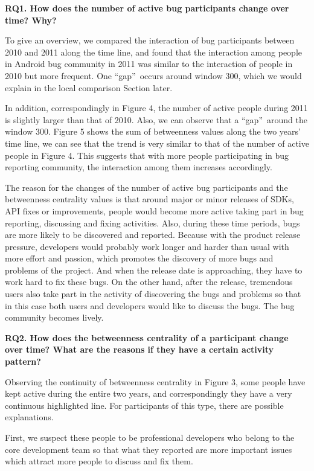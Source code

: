 \documentclass[10pt, conference, compsocconf]{IEEEtran}
\begin{document}
\textbf{RQ1. How does the number of active bug participants change over time? Why?}

To give an overview, we compared the interaction of bug participants
between 2010 and 2011 along the time line, and found that the
interaction among people in Android bug community in 2011 was similar
to the interaction of people in 2010 but more frequent. One
\textquotedblleft gap\textquotedblright \ occurs around window 300,
which we would explain in the local comparison Section later. 


In addition, correspondingly in Figure 4, the number of active people
during 2011 is slightly larger than that of 2010. Also, we can observe
that a \textquotedblleft gap\textquotedblright \ around the window
300. Figure 5 shows the sum of betweenness values along the two years'
time line, we can see that the trend is very similar to that of the
number of active people in Figure 4. This suggests that with more
people participating in bug reporting community, the interaction among
them increases accordingly.


The reason for the changes of the number of active bug participants
and the betweenness centrality values is that around major or minor
releases of SDKs, API fixes or improvements, people would become more
active taking part in bug reporting, discussing and fixing
activities. Also, during these time periods, bugs are more likely to
be discovered and reported. Because with the product release pressure,
developers would probably work longer and harder than usual with more
effort and passion, which promotes the discovery of more bugs and
problems of the project. And when the release date is approaching,
they have to work hard to fix these bugs. On the other hand, after the
release, tremendous users also take part in the activity of
discovering the bugs and problems so that in this case both users and
developers would like to discuss the bugs. The bug community becomes
lively. 


\textbf{RQ2. How does the betweenness centrality of a participant change over time? What are the reasons if they have a certain activity pattern?}

Observing the continuity of betweenness centrality in Figure 3, some
people have kept active during the entire two years, and
correspondingly they have a very continuous highlighted line. For
participants of this type, there are possible explanations. 


First, we suspect these people to be professional developers who
belong to the core development team so that what they reported are
more important issues which attract more people to discuss and fix
them. 
\end{document}
